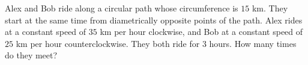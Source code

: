 Alex and Bob ride along a circular path whose circumference is $15$ km. They start at the same time from diametrically opposite points of the path. Alex rides at a constant speed of $35$ km per hour clockwise, and Bob at a constant speed of $25$ km per hour counterclockwise. They both ride for $3$ hours. How many times do they meet?
